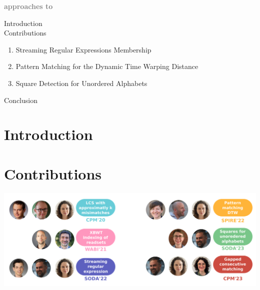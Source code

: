 \documentclass[aspectratio=169]{beamer}
\begin{document}
\begin{frame} 
  \begin{center}
    \Large
    \textbf{ \textcolor{gray}{approaches to}   }
  \end{center}
  \vfill
  \LARGE
  Introduction\\

  \bigskip
  Contributions\\
  \begin{enumerate}\Large
    \item Streaming Regular Expressions Membership
    \item Pattern Matching for the Dynamic Time Warping Distance
    \item Square Detection for Unordered Alphabets
  \end{enumerate}

  \bigskip
  Conclusion
  \vfill 
\end{frame}

\section{Introduction}


\section{Contributions}
\begin{frame}[plain]
  \vspace{1cm}

  \includegraphics[width=\textwidth]{pictures/mindmap/co_auth.png}
\end{frame}
\end{document}
